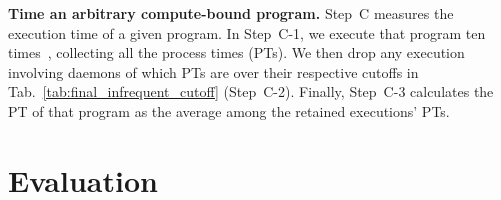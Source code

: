 \documentclass[letter]{ieice}
\begin{document}
{\color{blue}
{\bf Time an arbitrary compute-bound program.} 
Step~C measures the execution time of a given program. 
In Step~C-1, we execute that program ten times~\cite{Currim}, collecting all the process times (PTs).
We then drop any execution involving daemons of which PTs are over 
their respective cutoffs in Tab.~\ref{tab:final_infrequent_cutoff} (Step~C-2).
Finally, \hbox{Step~C-3} calculates the PT of that program as the average among the retained executions' PTs.

}

\section{Evaluation}
\label{sec:eval}
\vspace{-0.07in}
\end{document}
